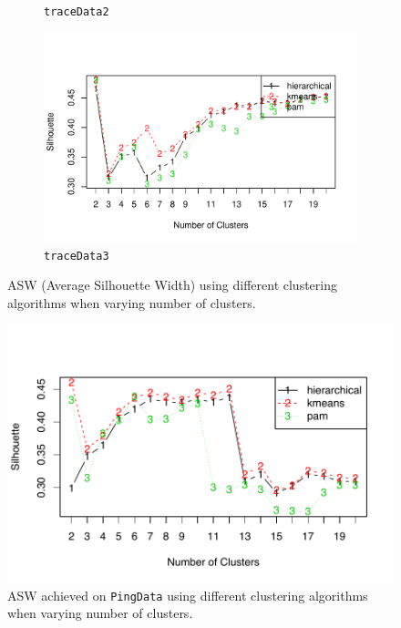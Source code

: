 \begin{figure}[!htb]
\begin{subfigure}[b]{.7\textwidth}
	\caption{\scriptsize \texttt{traceData2}}
	\label{fig:traceSil2}
	\end{subfigure}
	\begin{subfigure}[b]{.7\textwidth}
	\includegraphics[width=\textwidth]{gfx/chap3/traceSil3.pdf}
	\caption{\scriptsize \texttt{traceData3}}
	\label{fig:traceSil3}
	\end{subfigure}
\caption{ASW (Average Silhouette Width) using different clustering algorithms when varying number of clusters.}
\label{fig:sil}
\end{figure}
\fi

\begin{figure}[!htb]
\centering
\includegraphics[width=.9\textwidth]{gfx/chap3/pingSil.pdf}
\caption{\ac{ASW} achieved on \texttt{PingData} using different clustering algorithms when varying number of clusters.}
\label{fig:pingSil}
\end{figure}

